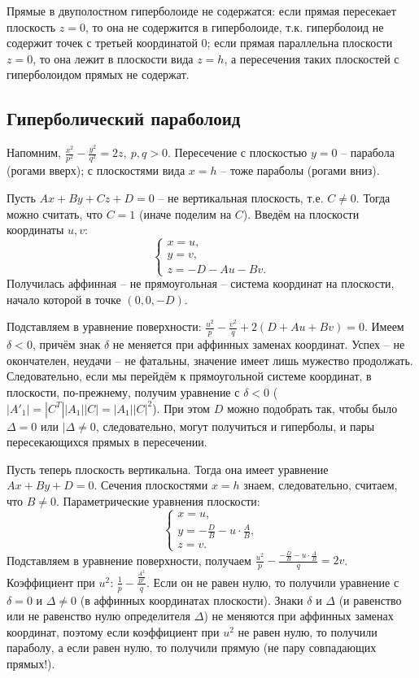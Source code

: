 \documentclass[a4paper, 12pt]{article}
\theoremstyle{definition}
\begin{document}
Прямые в двуполостном гиперболоиде не содержатся: если прямая пересекает плоскость $z = 0$, то она не содержится в гиперболоиде, т.к. гиперболоид не содержит точек с третьей координатой 0;
если прямая параллельна плоскости $z = 0$, то она лежит в плоскости вида $z = h$, а пересечения таких плоскостей с гиперболоидом прямых не содержат.


\subsection{Гиперболический параболоид}
Напомним, $\frac{x^2}{p^2} - \frac{y^2}{q^2} = 2z, \ p,q > 0$.
Пересечение с плоскостью $y=0$ – парабола (рогами вверх);
с плоскостями вида $x = h$ – тоже параболы (рогами вниз).

Пусть $Ax + By + Cz + D = 0$ – не вертикальная плоскость, т.е. $C \neq 0$.
Тогда можно считать, что $C = 1$ (иначе поделим на $C$).
Введём на плоскости координаты $u,v$:
\[\begin{cases}
    x = u, \\
    y = v, \\
    z = -D - Au - Bv.
\end{cases}\]
Получилась аффинная – не прямоугольная – система координат на плоскости, начало которой в точке $(0,0, -D)$.

Подставляем в уравнение поверхности: $\frac{u^2}{p} - \frac{v^2}{q} + 2(D + Au + Bv) = 0$. Имеем $\delta < 0$, причём знак $\delta$ не меняется при аффинных заменах координат. Успех – не окончателен, неудачи – не фатальны, значение имеет лишь мужество продолжать.
Следовательно, если мы перейдём к прямоугольной системе координат, в плоскости, по-прежнему, получим уравнение с $\delta < 0$ ($|A'_1| = |C^T| |A_1| |C| = |A_1||C|^2$).
При этом $D$ можно подобрать так, чтобы было $\Delta = 0$ или $|\Delta \neq 0$, следовательно, могут получиться и гиперболы, и пары пересекающихся прямых в пересечении.

Пусть теперь плоскость вертикальна. Тогда она имеет уравнение $Ax + By + D = 0$.
Сечения плоскостями $x = h$ знаем, следовательно, считаем, что $B \neq 0$.
Параметрические уравнения плоскости:
\[\begin{cases}
    x = u, \\
    y = - \frac{D}{B} - u \cdot \frac{A}{B}, \\
    z = v.
\end{cases}\]
Подставляем в уравнение поверхности, получаем
$\frac{u^2}{p} - \frac{- \frac{D}{B} - u \cdot \frac{A}{B}}{q} = 2v$.
Коэффициент при $u^2$: $\frac{1}{p} - \frac{\frac{A^2}{B^2}}{q}$. Если он не равен нулю, то получили уравнение с $\delta = 0$ и $\Delta \neq 0$ (в аффинных координатах плоскости). Знаки $\delta$ и $\Delta$ (и равенство или не равенство нулю определителя $\Delta$) не меняются при аффинных заменах координат, поэтому если коэффициент при $u^2$ не равен нулю, то получили параболу, а если равен нулю, то получили прямую (не пару совпадающих прямых!).
\end{document}
